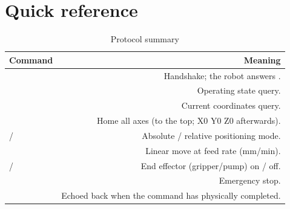 \section{Quick reference}
\begin{table}[h]
  \centering
  \begin{tabularx}{\textwidth}{lD}
    \toprule
    \textbf{Command} & \textbf{Meaning} \\
    \midrule
     & Handshake; the robot answers . \\
     & Operating state query. \\
     & Current coordinates query. \\
     & Home all axes (to the top; X0 Y0 Z0 afterwards). \\
     /  & Absolute / relative positioning mode. \\
     & Linear move at feed rate  (mm/min). \\
     /  & End effector (gripper/pump) on / off. \\
     & Emergency stop. \\
     & Echoed back when the command has physically
      completed. \\
    \bottomrule
  \end{tabularx}
  \caption{Protocol summary}
\end{table}
